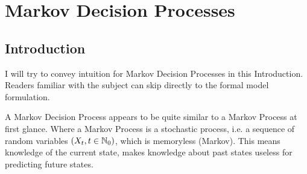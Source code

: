 
\chapter{Markov Decision Processes}
\section{Introduction}
I will try to convey intuition for Markov Decision Processes in this Introduction. Readers familiar with the subject can skip directly to the formal model formulation. 

A Markov Decision Process appears to be quite similar to a Markov Process at first glance. Where a Markov Process is a stochastic process, i.e. a sequence of random variables \((X_t,t\in\mathbb{N}_0)\), which is memoryless (Markov). This means knowledge of the current state, makes knowledge about past states useless for predicting future states.


